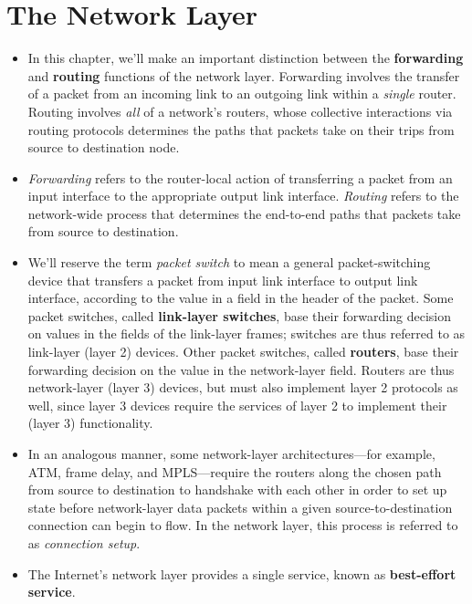 \section{The Network Layer}
\begin{itemize}

\item
In this chapter, we'll make an important distinction between the \textbf{forwarding} and \textbf{routing} functions of the network layer. Forwarding involves the transfer of a packet from an incoming link to an outgoing link within a \textit{single} router. Routing involves \textit{all} of a network's routers, whose collective interactions via routing protocols determines the paths that packets take on their trips from source to destination node.

\item
\textit{Forwarding} refers to the router-local action of transferring a packet from an input interface to the appropriate output link interface. \textit{Routing} refers to the network-wide process that determines the end-to-end paths that packets take from source to destination.

\item
We'll reserve the term \textit{packet switch} to mean a general packet-switching device that transfers a packet from input link interface to output link interface, according to the value in a field in the header of the packet. Some packet switches, called \textbf{link-layer switches}, base their forwarding decision on values in the fields of the link-layer frames; switches are thus referred to as link-layer (layer 2) devices. Other packet switches, called \textbf{routers}, base their forwarding decision on the value in the network-layer field. Routers are thus network-layer (layer 3) devices, but must also implement layer 2 protocols as well, since layer 3 devices require the services of layer 2 to implement their (layer 3) functionality.

\item
In an analogous manner, some network-layer architectures---for example, ATM, frame delay, and MPLS---require the routers along the chosen path from source to destination to handshake with each other in order to set up state before network-layer data packets within a given source-to-destination connection can begin to flow. In the network layer, this process is referred to as \textit{connection setup}.

\item
The Internet's network layer provides a single service, known as \textbf{best-effort service}.


\end{itemize}
